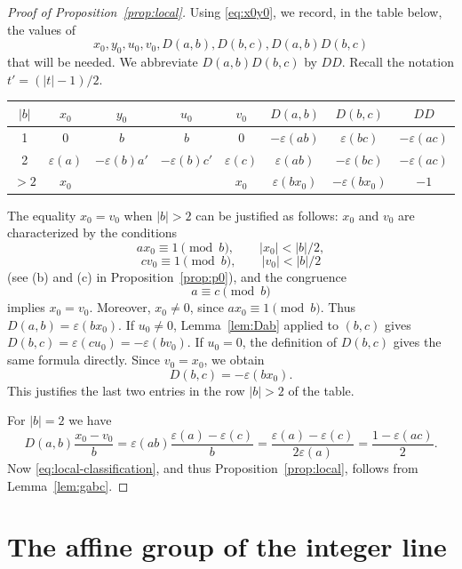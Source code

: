 \documentclass[12pt,letterpaper]{article}
\numberwithin{equation}{section}
\newcommand{\eps}{\varepsilon}
\theoremstyle{plain}
\theoremstyle{definition}
\begin{document}
\begin{proof}[Proof of Proposition~\ref{prop:local}] 
Using \eqref{eq:x0y0}, we record, in the table below, the values of 
\[
 x_0,y_0,u_0,v_0,D(a,b),D(b,c),D(a,b)D(b,c)
\]
that will be needed. We abbreviate $D(a,b)D(b,c)$ by $DD$. Recall the notation $t'=(|t|-1)/2$.

\begin{table}[H]
    \centering
    \begin{tabular}{|c|c|c|c|c|c|c|c|}
    \hline
    $|b|$ &   $x_0$   & $y_0$        & $u_0$        &   $v_0$   & $D(a,b)$     &   $D(b,c)$    &    $DD$     \\ \hline
      1   &   0       &  $b$         &  $b$         &     0     & $-\eps(ab)$  &  $\eps(bc)$   & $-\eps(ac)$ \\ \hline
      2   & $\eps(a)$ & $-\eps(b)a'$ & $-\eps(b)c'$ & $\eps(c)$ & $\eps(ab)$   & $-\eps(bc)$   & $-\eps(ac)$ \\ \hline
     $>2$ &   $x_0$   &              &              &   $x_0$   & $\eps(bx_0)$ & $-\eps(bx_0)$ & $-1$ \\ \hline
    \end{tabular}
\end{table}

The equality $x_0=v_0$ when $|b|>2$ can be justified as follows: $x_0$ and $v_0$ are characterized by the conditions
\[
 ax_0\equiv1\pmod b,\qquad |x_0|<|b|/2,
\]
\[
 cv_0\equiv1\pmod b,\qquad |v_0|<|b|/2
\]
(see (b) and (c) in Proposition~\ref{prop:p0}), and the congruence
\[
 a\equiv c\pmod b
\]
implies $x_0=v_0$. Moreover, $x_0\ne0$, since $ax_0\equiv1\pmod b$. Thus
$D(a,b)=\eps(bx_0)$. If $u_0\ne0$, Lemma~\ref{lem:Dab} applied to $(b,c)$ gives
$D(b,c)=\eps(cu_0)=-\eps(bv_0)$. If $u_0=0$, the definition of $D(b,c)$ gives the same formula directly. Since $v_0=x_0$, we obtain
\[
 D(b,c)=-\eps(bx_0).
\]
This justifies the last two entries in the row $|b|>2$ of the table.

For $|b|=2$ we have
\[
 D(a,b)\frac{x_0-v_0}{b}=\eps(ab)\frac{\eps(a)-\eps(c)}{b}=\frac{\eps(a)-\eps(c)}{2\eps(a)}=\frac{1-\eps(ac)}{2}.
\]
Now \eqref{eq:local-classification}, and thus Proposition~\ref{prop:local}, follows from Lemma~\ref{lem:gabc}.
\end{proof}

\section{The affine group of the integer line}
\end{document}
